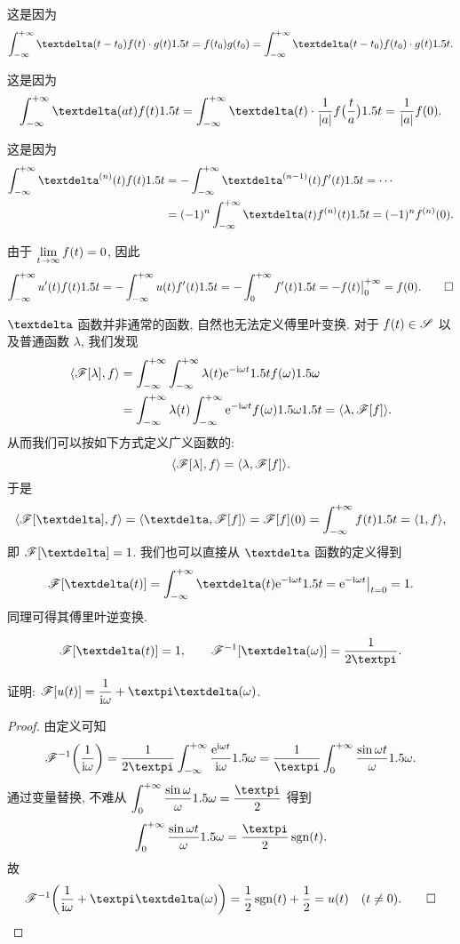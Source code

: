 \begin{proofenuma}
  \item 这是因为
  \[
    \intff \dirac(t-t_0)f(t)\cdot g(t)\d t=f(t_0)g(t_0)
    =\intff \dirac(t-t_0)f(t_0)\cdot g(t)\d t.
  \]
  \item 这是因为
  \[
    \intff \dirac(at)f(t)\d t
    =\intff \dirac(t)\cdot \frac1{\abs{a}}f\bigl(\frac ta\bigr)\d t
    =\frac1{\abs{a}}f(0).
  \]
  \item 这是因为
  \begin{align*}
    \intff \dirac^{(n)}(t)f(t)\d t
    &=-\intff \dirac^{(n-1)}(t)f'(t)\d t
    =\cdots\\
    &=(-1)^n\intff \dirac(t)f^{(n)}(t)\d t
    =(-1)^nf^{(n)}(0).
  \end{align*}
  \item 由于 $\lim\limits_{t\rightarrow\infty}f(t)=0$, 因此
  \[
    \displaystyle\int_{-\infty}^{+\infty} u'(t)f(t)1.5 t
    =-\displaystyle\int_{-\infty}^{+\infty} u(t)f'(t)1.5 t
    =-\displaystyle\int_0^{+\infty} f'(t)1.5 t
    =-f(t)\big|_0^{+\infty}
    =f(0).\qedhere
  \]
\end{proofenuma}

$\dirac$ 函数并非通常的函数, 自然也无法定义傅里叶变换.
对于 $f(t)\in\mathscr{S}$ 以及普通函数 $\lambda$, 我们发现
\begin{align*}
  \langle{\mathscr{F}[\lambda],f}\rangle&
  =\displaystyle\int_{-\infty}^{+\infty}\displaystyle\int_{-\infty}^{+\infty} \lambda(t)\mathrm{e}^{-\mathrm{i} \omega t}1.5 t f(\omega)1.5 \omega\\&
  =\displaystyle\int_{-\infty}^{+\infty}\lambda(t) \displaystyle\int_{-\infty}^{+\infty} \mathrm{e}^{-\mathrm{i} \omega t}f(\omega)1.5 \omega1.5 t 
  =\langle{\lambda,\mathscr{F}[f]}\rangle.
\end{align*}
从而我们可以按如下方式定义广义函数的:
\[
  \langle{\mathscr{F}[\lambda],f}\rangle=\langle{\lambda,\mathscr{F}[f]}\rangle.
\]
于是
\[
  \pair{\msf[\dirac],f}
  =\pair{\dirac,\msf[f]}
  =\msf[f](0)
  =\intff f(t)\d t=\pair{1,f},
\]
即 $\msf[\dirac]=1$.
我们也可以直接从 $\dirac$ 函数的定义得到
\[
  \msf[\dirac(t)]
  =\intff \dirac(t)\ee^{-\ii \omega t}\d t
  =\ee^{-\ii \omega t}\big|_{t=0}
  =1.
\]
同理可得其傅里叶逆变换.

\begin{theorem}
  \[
    \msf[\dirac(t)]=1,\qquad
    \msf^{-1}[\dirac(\omega)]=\dfrac1{2\cpi}.
  \]
\end{theorem}

\begin{example}\label{exam:fourier-transform-ut}
  证明: $\msf[u(t)]=\dfrac1{\ii \omega}+\cpi\dirac(\omega)$.
\end{example}

\begin{proof}
  由定义可知
  \[
    \msf^{-1}\biggl(\frac1{\ii \omega}\biggr)
    =\frac1{2\cpi}\intff \frac{\ee^{\ii \omega t}}{\ii \omega} \d\omega
    =\frac1\cpi\intf\frac{\sin\omega t}{\omega} \d\omega.
  \]
  通过变量替换, 不难从 $\intf\frac{\sin\omega}\omega \d\omega=\dfrac\cpi2$ 得到
  \[
    \intf\frac{\sin\omega t}\omega \d\omega=\frac\cpi2\sgn(t).
  \]
  故
  \[
    \msf^{-1} \biggl(\frac1{\ii \omega}+\cpi\dirac(\omega)\biggr)
    =\half\sgn(t)+\half =u(t)\quad (t\neq 0).\qedhere
  \]
\end{proof}


